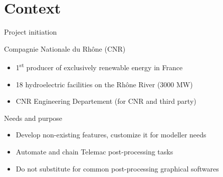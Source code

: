 \section{Context}


\begin{frame}{Project initiation}

  \begin{block}{Compagnie Nationale du Rhône (CNR)}
    \begin{itemize}
      \item 1\textsuperscript{st} producer of exclusively renewable energy in France
      \item 18 hydroelectric facilities on the Rhône River (3000 MW)
      \item CNR Engineering Departement (for CNR and third party)
    \end{itemize}
  \end{block}

  \pause

  \begin{block}{Needs and purpose}
    \begin{itemize}
      \item Develop non-existing features, customize it for modeller needs
      \item Automate and chain Telemac post-processing tasks
      \item Do not substitute for common post-processing graphical softwares
    \end{itemize}
  \end{block}

\end{frame}


